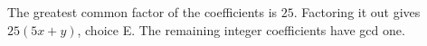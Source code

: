 The greatest common factor of the coefficients is $25$. Factoring it out gives $\boxed{25(5x+y)}$, choice E. The remaining integer coefficients have gcd one.
